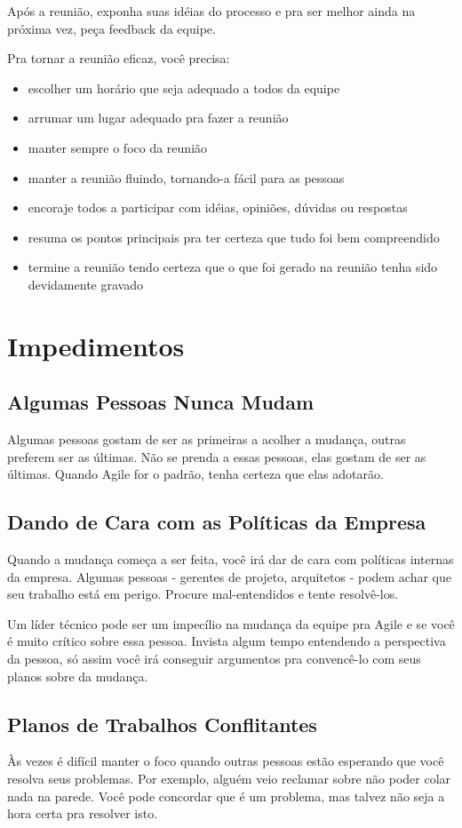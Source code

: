 \documentclass[a4paper, 10pt, font=plain]{abnt}
\begin{document}
Após a reunião, exponha suas idéias do processo e pra ser melhor ainda na próxima vez, peça feedback da equipe.

Pra tornar a reunião eficaz, você precisa:
\begin{itemize}
\item escolher um horário que seja adequado a todos da equipe
\item arrumar um lugar adequado pra fazer a reunião
\item manter sempre o foco da reunião
\item manter a reunião fluindo, tornando-a fácil para as pessoas
\item encoraje todos a participar com idéias, opiniões, dúvidas ou respostas
\item resuma os pontos principais pra ter certeza que tudo foi bem compreendido
\item termine a reunião tendo certeza que o que foi gerado na reunião tenha sido devidamente gravado
\end{itemize}


\section{Impedimentos}

\subsection{Algumas Pessoas Nunca Mudam}
Algumas pessoas gostam de ser as primeiras a acolher a mudança, outras preferem ser as últimas. Não se prenda a essas pessoas, elas gostam de ser as últimas. Quando Agile for o padrão, tenha certeza que elas adotarão.


\subsection{Dando de Cara com as Políticas da Empresa}
Quando a mudança começa a ser feita, você irá dar de cara com políticas internas da empresa. Algumas pessoas - gerentes de projeto, arquitetos - podem achar que seu trabalho está em perigo. Procure mal-entendidos e tente resolvê-los.

Um líder técnico pode ser um impecílio na mudança da equipe pra Agile e se você é muito crítico sobre essa pessoa. Invista algum tempo entendendo a perspectiva da pessoa, só assim você irá conseguir argumentos pra convencê-lo com seus planos sobre da mudança.


\subsection{Planos de Trabalhos Conflitantes}
Às vezes é difícil manter o foco quando outras pessoas estão esperando que você resolva seus problemas. Por exemplo, alguém veio reclamar sobre não poder colar nada na parede. Você pode concordar que é um problema, mas talvez não seja a hora certa pra resolver isto.
\end{document}
